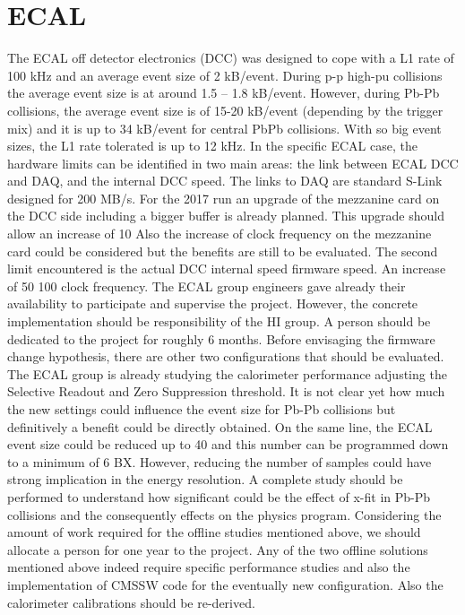 \section{ECAL\label{sec:ECAL}} 
The ECAL off detector electronics (DCC) was designed to cope with a L1 rate of 100 kHz and an average event size of 2
kB/event.  During p-p high-pu collisions the average event size is at around 1.5 – 1.8 kB/event. However, during Pb-Pb
collisions, the average event size is of 15-20 kB/event (depending by the trigger mix) and it is up to 34 kB/event for
central PbPb collisions. With so big event sizes, the L1 rate tolerated is up to 12 kHz. In the specific ECAL case, the
hardware limits can be identified in two main areas: the link between ECAL DCC and DAQ, and the internal DCC speed.  The
links to DAQ are standard S-Link designed for 200 MB/s. For the 2017 run an upgrade of the mezzanine card on the DCC
side including a bigger buffer is already planned. This upgrade should allow an increase of 10%
Also the increase of clock frequency on the mezzanine card could be considered but the benefits are still to be
evaluated. The second limit encountered is the actual DCC internal speed firmware speed. An increase of 50 %
100 %
clock frequency. The ECAL group engineers gave already their availability to participate and supervise the project.
However, the concrete implementation should be responsibility of the HI group. A person should be dedicated to the
project for roughly 6 months. Before envisaging the firmware change hypothesis, there are other two configurations that
should be evaluated. The ECAL group is already studying the calorimeter performance adjusting the Selective Readout and
Zero Suppression threshold. It is not clear yet how much the new settings could influence the event size for Pb-Pb
collisions but definitively a benefit could be directly obtained. On the same line, the ECAL event size could be reduced
up to 40 %
and this number can be programmed down to a minimum of 6 BX. However, reducing the number of samples could have strong
implication in the energy resolution. A complete study should be performed to understand how significant could be the
effect of x-fit in Pb-Pb collisions and the consequently effects on the physics program. Considering the amount of work
required for the offline studies mentioned above, we should allocate a person for one year to the project. Any of the
two offline solutions mentioned above indeed require specific performance studies and also the implementation of CMSSW
code for the eventually new configuration. Also the calorimeter calibrations should be re-derived. 

